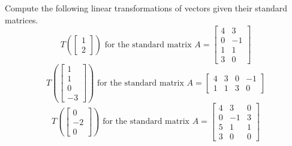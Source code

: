 \begin{applicationActivities}
\begin{activity}{15}
  Compute the following linear transformations of vectors given their
  standard matrices.
  \[
    T\left(\begin{bmatrix}1\\2\end{bmatrix}\right)
    \text{ for the standard matrix }
    A=\begin{bmatrix}4&3\\0&-1\\1&1\\3&0\end{bmatrix}
  \]
  \[
    T\left(\begin{bmatrix}1\\1\\0\\-3\end{bmatrix}\right)
    \text{ for the standard matrix }
    A=\begin{bmatrix}4&3&0&-1\\1&1&3&0\end{bmatrix}
  \]
  \[
    T\left(\begin{bmatrix}0\\-2\\0\end{bmatrix}\right)
    \text{ for the standard matrix }
    A=\begin{bmatrix}4&3&0\\0&-1&3\\5&1&1\\3&0&0\end{bmatrix}
  \]
\end{activity}

\end{applicationActivities}
